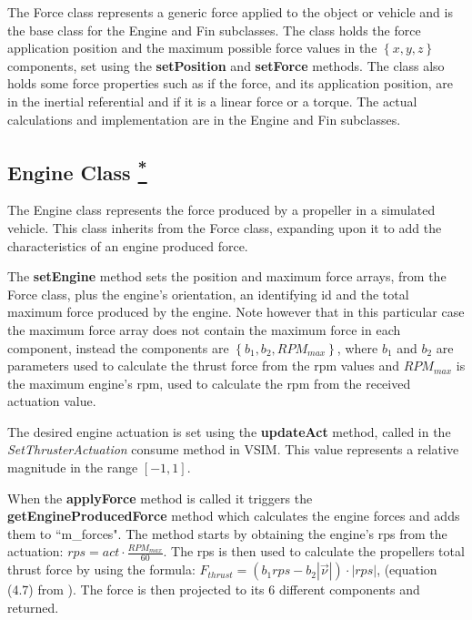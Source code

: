 \documentclass[10pt,a4paper]{article}
\begin{document}
\par The Force class represents a generic force applied to the object or vehicle and is the base class for the Engine and Fin subclasses. The class holds the force application position and the maximum possible force values in the $\left\{x,y,z\right\}$ components, set using the \textbf{setPosition} and \textbf{setForce} methods. The class also holds some force properties such as if the force, and its application position, are in the inertial referential and if it is a linear force or a torque. The actual calculations and implementation are in the Engine and Fin subclasses.

\subsection{Engine Class \href{https://www.lsts.pt/docs/dune/dune-2017.01.0-dmsmw/d3/df7/classSimulators_1_1VSIM_1_1Engine.html}{\textsuperscript{*}}}
\label{engine_class}

\par The Engine class represents the force produced by a propeller in a simulated vehicle. This class inherits from the Force class, expanding upon it to add the characteristics of an engine produced force. 

\par The \textbf{setEngine} method sets the position and maximum force arrays, from the Force class, plus the engine's orientation, an identifying id and the total maximum force produced by the engine. Note however that in this particular case the maximum force array does not contain the maximum force in each component, instead the components are $\left\{b_1, b_2, RPM_{max}\right\}$, where $b_1$ and $b_2$ are parameters used to calculate the thrust force from the rpm values and $RPM_{max}$ is the maximum engine's rpm, used to calculate the rpm from the received actuation value.

\par The desired engine actuation is set using the \textbf{updateAct} method, called in the \textit{SetThrusterActuation} consume method in VSIM. This value represents a relative magnitude in the range $\left[-1,1\right]$.

\par When the \textbf{applyForce} method is called it triggers the \textbf{getEngineProducedForce} method which calculates the engine forces and adds them to ``m\_forces". The method starts by obtaining the engine's rps from the actuation: $rps = act\cdot \frac{RPM_{max}}{60}$. The rps is then used to calculate the propellers total thrust force by using the formula: $F_{thrust} = \left(b_1 rps - b_2 \left|\vec{\nu}\right| \right) \cdot \left| rps \right|$, (equation (4.7) from \cite{fossen}). The force is then projected to its 6 different components and returned.
\end{document}
